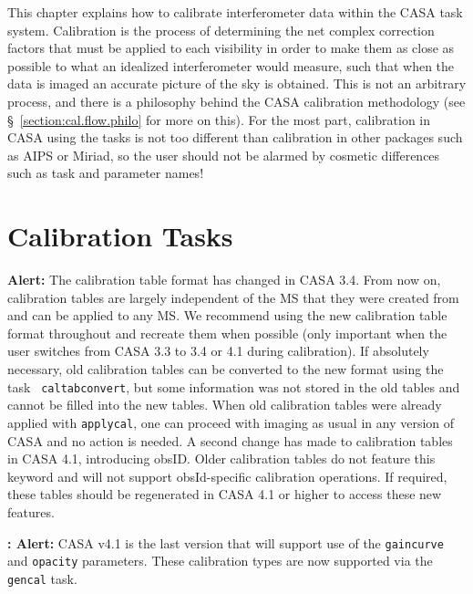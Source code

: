 This chapter explains how to calibrate interferometer
data within the CASA task system.  Calibration is the process
of determining the net complex correction factors that must be 
applied to each visibility in order to make them as close as
possible to what an idealized interferometer would measure, such
that when the data is imaged an accurate picture of the sky
is obtained.  This is not an arbitrary process, and there is
a philosophy behind the CASA calibration methodology (see
\S~\ref{section:cal.flow.philo} for more on this).  For the most part,
calibration in CASA using the tasks is not too different than
calibration in other packages such as AIPS or Miriad, so the user
should not be alarmed by cosmetic differences such as task and
parameter names!

\section{Calibration Tasks}
\label{section:cal.tasks}

{\bf Alert:} The calibration table format has changed in CASA
3.4. From now on, calibration tables are largely independent of the MS that
they were created from and can be applied to any MS. We recommend
using the new calibration table format throughout and recreate them
when possible (only important when the user switches from CASA 3.3
to 3.4 or 4.1 during calibration). If absolutely necessary, old calibration
tables can be converted to the new format using the task {\tt
  caltabconvert}, but some information was not stored in the old
tables and cannot be filled into the new tables. When old calibration
tables were already applied with {\tt applycal}, one can proceed with
imaging as usual in any version of CASA and no action is needed.
A second change has made to calibration tables in CASA 4.1,
introducing obsID. Older calibration tables do not feature this
keyword and will not support obsId-specific calibration operations.
If required, these tables should be regenerated in CASA 4.1 or higher
to access these new features.

{\bf: Alert:} CASA v4.1 is the last version that will support use
of the {\tt gaincurve} and {\tt opacity} parameters.  These
calibration types are now supported via the {\tt gencal} task.



